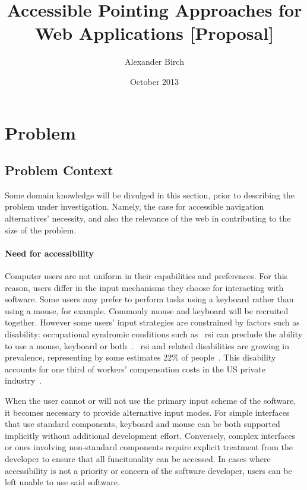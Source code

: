 \documentclass[a4paper, 11pt]{article}
\title{Accessible Pointing Approaches for Web Applications [Proposal]}
\author{Alexander Birch}
\date{October 2013}
\begin{document}

\maketitle

\section{Problem}
\subsection{Problem Context}
Some domain knowledge will be divulged in this section, prior to describing the problem under investigation. Namely, the case for accessible navigation alternatives' necessity, and also the relevance of the web in contributing to the size of the problem.
\paragraph{Need for accessibility}
Computer users are not uniform in their capabilities and preferences. For this reason, users differ in the input mechanisms they choose for interacting with software. Some users may prefer to perform tasks using a keyboard rather than using a mouse, for example. Commonly mouse and keyboard will be recruited together. However some users' input strategies are constrained by factors such as disability: occupational syndromic conditions such as ~\gls{rsi} can preclude the ability to use a mouse, keyboard or both~\cite{trewin1999keyboard}. ~\gls{rsi} and related disabilities are growing in prevalence, representing by some estimates 22\% of people~\cite{rsiprevalence}. This disability accounts for one third of workers' compensation costs in the US private industry~\cite{barr2002pathophysiological}.

When the user cannot or will not use the primary input scheme of the software, it becomes necessary to provide alternative input modes. For simple interfaces that use standard components, keyboard and mouse can be both supported implicitly without additional development effort. Conversely, complex interfaces or ones involving non-standard components require explicit treatment from the developer to ensure that all funcitonality can be accessed. In cases where accessibility is not a priority or concern of the software developer, users can be left unable to use said software.
\end{document}

